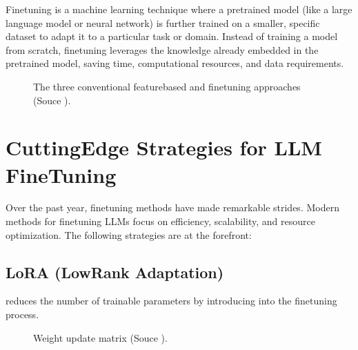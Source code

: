 \documentclass[letterpaper,11pt,english]{sphinxmanual}
\begin{document}
\sphinxAtStartPar
Fine\sphinxhyphen{}tuning is a machine learning technique where a pre\sphinxhyphen{}trained model (like a large
language model or neural network) is further trained on a smaller, specific dataset
to adapt it to a particular task or domain. Instead of training a model from scratch,
fine\sphinxhyphen{}tuning leverages the knowledge already embedded in the pre\sphinxhyphen{}trained model,
saving time, computational resources, and data requirements.

\begin{figure}[htbp]
\centering
\capstart

\noindent{}
\caption{The three conventional feature\sphinxhyphen{}based and finetuning approaches (Souce ).}\label{\detokenize{finetuning:id4}}\label{\detokenize{finetuning:fig-fine-tuning}}\end{figure}


\section{Cutting\sphinxhyphen{}Edge Strategies for LLM Fine\sphinxhyphen{}Tuning}
\label{\detokenize{finetuning:cutting-edge-strategies-for-llm-fine-tuning}}
\sphinxAtStartPar
Over the past year, fine\sphinxhyphen{}tuning methods have made remarkable strides. Modern methods
for fine\sphinxhyphen{}tuning LLMs focus on efficiency, scalability, and resource optimization.
The following strategies are at the forefront:


\subsection{LoRA (Low\sphinxhyphen{}Rank Adaptation)}
\label{\detokenize{finetuning:lora-low-rank-adaptation}}
\sphinxAtStartPar
{} reduces the number of trainable parameters by introducing  into the fine\sphinxhyphen{}tuning process.

\begin{figure}[htbp]
\centering
\capstart

\noindent{}
\caption{Weight update matrix (Souce ).}\label{\detokenize{finetuning:id5}}\label{\detokenize{finetuning:fig-lora}}\end{figure}
\end{document}
